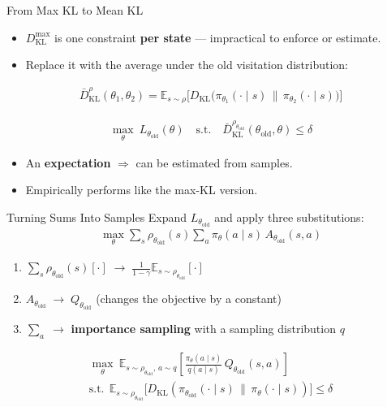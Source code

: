 \documentclass[aspectratio=169]{beamer}
\newcommand{\E}{\mathbb{E}}
\newcommand{\DKL}{D_{\mathrm{KL}}}
\newcommand{\told}{\theta_{\mathrm{old}}}
\begin{document}
\begin{frame}{From Max KL to Mean KL}
  \begin{itemize}
    \item $\DKL^{\max}$ is one constraint \textbf{per state} --- impractical to enforce or estimate.
    \item Replace it with the average under the old visitation distribution:
  \end{itemize}
  \begin{gather*}
    \bar D_{\mathrm{KL}}^{\rho}(\theta_1,\theta_2) = \E_{s\sim\rho}\Big[\DKL\big(\pi_{\theta_1}(\cdot\mid s)\,\|\,\pi_{\theta_2}(\cdot\mid s)\big)\Big]
  \end{gather*}
  \begin{formulabox}
    \begin{gather*}
      \max_\theta\ L_{\told}(\theta) \quad\text{s.t.}\quad \bar D_{\mathrm{KL}}^{\rho_{\told}}(\told,\theta) \le \delta
    \end{gather*}
  \end{formulabox}
  \begin{itemize}
    \item An \textbf{expectation} $\Rightarrow$ can be estimated from samples.
    \item Empirically performs like the max-KL version.
  \end{itemize}
\end{frame}

\begin{frame}{Turning Sums Into Samples}
  Expand $L_{\told}$ and apply three substitutions:
  \begin{gather*}
    \max_\theta \sum_s \rho_{\told}(s) \sum_a \pi_\theta(a\mid s)\, A_{\told}(s,a)
  \end{gather*}
  \begin{enumerate}
    \item $\sum_s \rho_{\told}(s)[\cdot] \;\to\; \frac{1}{1-\gamma}\E_{s\sim\rho_{\told}}[\cdot]$
    \item $A_{\told} \;\to\; Q_{\told}$ \hfill {\small(changes the objective by a constant)}
    \item $\sum_a \;\to$ \textbf{importance sampling} with a sampling distribution $q$
  \end{enumerate}
  \begin{formulabox}
    \begin{gather*}
      \max_\theta\ \E_{s\sim\rho_{\told},\,a\sim q}\!\left[\frac{\pi_\theta(a\mid s)}{q(a\mid s)}\,Q_{\told}(s,a)\right] \\
      \text{s.t.}\ \ \E_{s\sim\rho_{\told}}\!\big[\DKL(\pi_{\told}(\cdot\mid s)\,\|\,\pi_\theta(\cdot\mid s))\big] \le \delta
    \end{gather*}
  \end{formulabox}
\end{frame}
\end{document}
